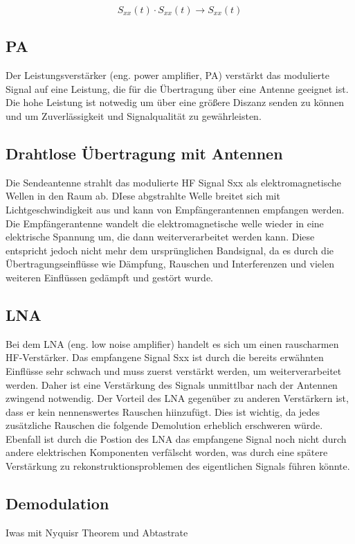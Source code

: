 \begin{equation}
    S_{xx}(t) \cdot S_{xx}(t) \rightarrow S_{xx}(t)
\end{equation}


\subsection{PA}
Der Leistungsverstärker (eng. power amplifier, PA) verstärkt das modulierte Signal auf eine Leistung, die für die Übertragung über eine Antenne 
geeignet ist. Die hohe Leistung ist notwedig um über eine größere Diszanz senden zu können und um Zuverlässigkeit und
Signalqualität zu gewährleisten. 

\subsection{Drahtlose Übertragung mit Antennen}
Die Sendeantenne strahlt das modulierte HF Signal Sxx als elektromagnetische Wellen in den Raum ab. DIese abgstrahlte Welle
breitet sich mit Lichtgeschwindigkeit aus und kann von Empfängerantennen empfangen werden. Die Empfängerantenne wandelt
die elektromagnetische welle wieder in eine elektrische Spannung um, die dann weiterverarbeitet werden kann. Diese entspricht
jedoch nicht mehr dem ursprünglichen Bandsignal, da es durch die Übertragungseinflüsse wie Dämpfung, Rauschen und Interferenzen
und vielen weiteren Einflüssen gedämpft und gestört wurde.

\subsection{LNA}
Bei dem LNA (eng. low noise amplifier) handelt es sich um einen rauscharmen HF-Verstärker. Das empfangene Signal Sxx ist
durch die bereits erwähnten Einflüsse sehr schwach und muss  zuerst verstärkt werden, um weiterverarbeitet werden. Daher
ist eine Verstärkung des Signals unmittlbar nach der Antennen zwingend notwendig. Der Vorteil des LNA gegenüber zu
anderen Verstärkern ist, dass er kein nennenswertes Rauschen hiinzufügt. Dies ist wichtig, da jedes zusätzliche Rauschen
die folgende Demolution erheblich erschweren würde. Ebenfall ist durch die Postion des LNA das empfangene Signal noch 
nicht durch andere elektrischen Komponenten verfälscht worden, was durch eine spätere Verstärkung zu rekonstruktionsproblemen
des eigentlichen Signals führen könnte.
\subsection{Demodulation}
Iwas mit Nyquisr Theorem und Abtastrate 

